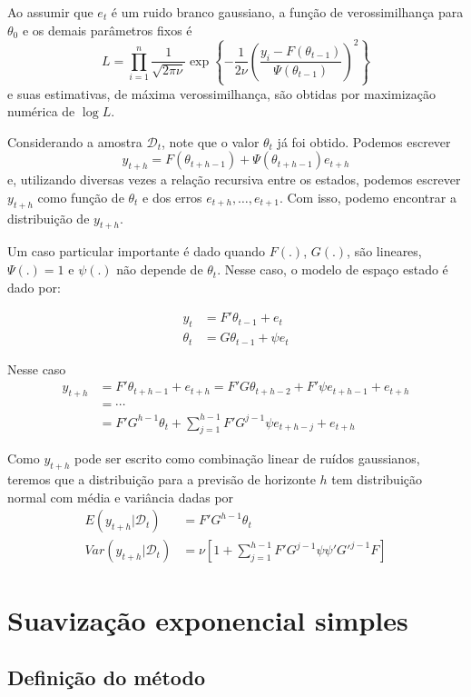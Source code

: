 \documentclass[
  letterpaper,
  DIV=11,
  numbers=noendperiod]{scrartcl}
\theoremstyle{plain}
\theoremstyle{plain}
\theoremstyle{definition}
\theoremstyle{definition}
\theoremstyle{remark}
\begin{document}
Ao assumir que \(e_t\) é um ruido branco gaussiano, a função de
verossimilhança para \(\theta_0\) e os demais parâmetros fixos é
\[L=\prod_{i=1}^n\frac{1}{\sqrt{2\pi\nu}}\exp\left\{-\frac{1}{2\nu}\left(\frac{y_i-F(\theta_{t-1})}{\Psi(\theta_{t-1})}\right)^2\right\}\]
e suas estimativas, de máxima verossimilhança, são obtidas por
maximização numérica de \(\log L\).

Considerando a amostra \(\mathcal{D}_t\), note que o valor \(\theta_t\)
já foi obtido. Podemos escrever
\[y_{t+h}=F(\theta_{t+h-1})+\Psi(\theta_{t+h-1})e_{t+h}\] e, utilizando
diversas vezes a relação recursiva entre os estados, podemos escrever
\(y_{t+h}\) como função de \(\theta_t\) e dos erros
\(e_{t+h},\ldots, e_{t+1}\). Com isso, podemo encontrar a distribuição
de \(y_{t+h}\).

Um caso particular importante é dado quando \(F(.)\), \(G(.)\), são
lineares,\(\Psi(.)=1\) e \(\psi(.)\) não depende de \(\theta_t\). Nesse
caso, o modelo de espaço estado é dado por:

\[\begin{align}y_t&=F'\theta_{t-1}+e_t\\
\theta_t&= G\theta_{t-1}+\psi e_t
\end{align}\]

Nesse caso\[\begin{align}
y_{t+h}&=F'\theta_{t+h-1}+e_{t+h}=F'G\theta_{t+h-2}+F'\psi e_{t+h-1} + e_{t+h}\\
&=\cdots\\
&=F'G^{h-1}\theta_t+\sum_{j=1}^{h-1}F'G^{j-1}\psi e_{t+h-j}+e_{t+h}
\end{align}\]

Como \(y_{t+h}\) pode ser escrito como combinação linear de ruídos
gaussianos, teremos que a distribuição para a previsão de horizonte
\(h\) tem distribuição normal com média e variância dadas por
\[\begin{align}
E(y_{t+h}|\mathcal{D}_t)&=F'G^{h-1}\theta_t\\
Var(y_{t+h}|\mathcal{D}_t)&=\nu\left[1+\sum_{j=1}^{h-1}F'G^{j-1}\psi\psi'G'^{j-1}F\right]
\end{align}\]

\hypertarget{suavizauxe7uxe3o-exponencial-simples}{%
\section{Suavização exponencial
simples}\label{suavizauxe7uxe3o-exponencial-simples}}

\hypertarget{definiuxe7uxe3o-do-muxe9todo}{%
\subsection{Definição do método}\label{definiuxe7uxe3o-do-muxe9todo}}
\end{document}

